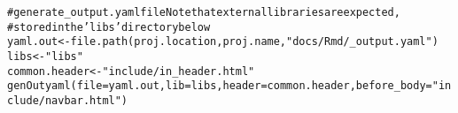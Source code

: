 \documentclass{article}\usepackage[]{graphicx}\usepackage[]{color}
\makeatletter
\newcommand{\hlstr}[1]{\textcolor[rgb]{0.863,0.196,0.184}{#1}}%
\newcommand{\hlcom}[1]{\textcolor[rgb]{0.345,0.431,0.459}{#1}}%
\newcommand{\hlstd}[1]{\textcolor[rgb]{0.514,0.58,0.588}{#1}}%
\newcommand{\hlkwb}[1]{\textcolor[rgb]{0.522,0.6,0}{#1}}%
\newcommand{\hlkwc}[1]{\textcolor[rgb]{0.796,0.294,0.086}{#1}}%
\newcommand{\hlkwd}[1]{\textcolor[rgb]{0.576,0.631,0.631}{#1}}%
\newenvironment{kframe}{%
 \def\at@end@of@kframe{}%
 \ifinner\ifhmode%
  \def\at@end@of@kframe{\end{minipage}}%
  \begin{minipage}{\columnwidth}%
 \fi\fi%
 \def\FrameCommand##1{\hskip\@totalleftmargin \hskip-\fboxsep
 \colorbox{shadecolor}{##1}\hskip-\fboxsep
     \hskip-\linewidth \hskip-\@totalleftmargin \hskip\columnwidth}%
 \MakeFramed {\advance\hsize-\width
   \@totalleftmargin\z@ \linewidth\hsize
   \@setminipage}}%
 {\par\unskip\endMakeFramed%
 \at@end@of@kframe}
\newenvironment{knitrout}{}{} %
\makeatother
\begin{document}
\begin{knitrout}
\begin{kframe}
\begin{alltt}
\hlcom{# generate _output.yaml file Note that external libraries are expected,}
\hlcom{# stored in the 'libs' directory below}
\hlstd{yaml.out} \hlkwb{<-} \hlkwd{file.path}\hlstd{(proj.location, proj.name,} \hlstr{"docs/Rmd/_output.yaml"}\hlstd{)}
\hlstd{libs} \hlkwb{<-} \hlstr{"libs"}
\hlstd{common.header} \hlkwb{<-} \hlstr{"include/in_header.html"}
\hlkwd{genOutyaml}\hlstd{(}\hlkwc{file} \hlstd{= yaml.out,} \hlkwc{lib} \hlstd{= libs,} \hlkwc{header} \hlstd{= common.header,} \hlkwc{before_body} \hlstd{=} \hlstr{"include/navbar.html"}\hlstd{)}
\end{alltt}
\end{kframe}
\end{knitrout}
\end{document}
